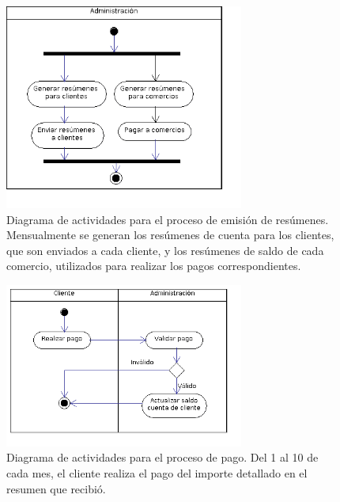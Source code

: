 \begin{figure}[htb]
\begin{center}
\includegraphics[width=0.7\textwidth]{images/mod_negocio_act_resumenes.png}
\end{center}
\caption{Diagrama de actividades para el proceso de emisión de resúmenes.
Mensualmente se generan los resúmenes de cuenta para los clientes, que son
enviados a cada cliente, y los resúmenes de saldo de cada comercio, utilizados
para realizar los pagos correspondientes.}
\end{figure}

\begin{figure}[htb]
\begin{center}
\includegraphics[width=0.7\textwidth]{images/mod_negocio_act_pago.png}
\end{center}
\caption{Diagrama de actividades para el proceso de pago. Del 1 al 10 de cada
mes, el cliente realiza el pago del importe detallado en el resumen que
recibió.}
\end{figure}

\FloatBarrier
